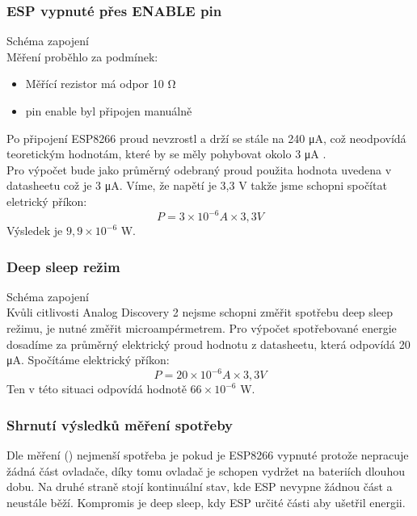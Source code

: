 \documentclass[a4paper, 12pt]{report}
\begin{document}
				\subsubsection{ESP vypnuté přes ENABLE pin}
					Schéma zapojení \\
					Měření proběhlo za podmínek:
					\begin{itemize}
						\item Měřící rezistor má odpor 10 \si{\ohm}
						\item pin enable byl připojen manuálně
					\end{itemize}
					Po připojení ESP8266 proud nevzrostl a drží se stále na 240 \si{\micro A}, což neodpovídá teoretickým hodnotám, které by se měly pohybovat okolo 3 \si{\micro A}
					.\\
					Pro výpočet bude jako průměrný odebraný proud použita hodnota uvedena v datasheetu což je 3 \si{\micro A}. Víme, že napětí je 3,3 \si{V} takže jsme schopni spočítat eletrický příkon:
				 		$$P = 3\times 10^{-6} \si{A}\times 3,3 \si{V}$$
					Výsledek je $9,9 \times 10^{-6}$ \si{\watt}.

				\subsubsection{Deep sleep režim}
					Schéma zapojení \\
					Kvůli citlivosti Analog Discovery 2 nejsme schopni změřit spotřebu deep sleep režimu, je nutné změřit microampérmetrem. Pro výpočet spotřebované energie dosadíme za průměrný elektrický proud hodnotu z datasheetu, která odpovídá 20 \si{\micro A}. Spočítáme elektrický příkon:
						$$P = 20\times 10^{-6} \si{A}\times 3,3 \si{V}$$
					Ten v této situaci odpovídá hodnotě $66 \times 10^{-6}$ \si{\watt}.

				\subsubsection{Shrnutí výsledků měření spotřeby}
					Dle měření () nejmenší spotřeba je pokud je ESP8266 vypnuté protože nepracuje žádná část ovladače, díky tomu ovladač je schopen vydržet na bateriích dlouhou dobu. Na druhé straně stojí kontinuální stav, kde ESP nevypne žádnou část a neustále běží. Kompromis je deep sleep, kdy ESP určité části aby ušetřil energii.
\end{document}
